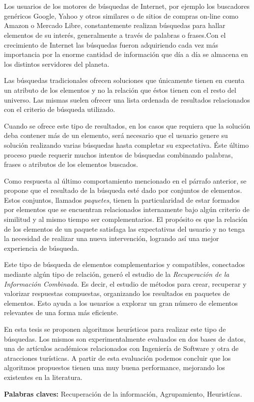 \chapter*{\runtitulo}

\noindent 

Los usuarios de los motores de búsquedas de Internet, por ejemplo los buscadores genéricos Google, Yahoo y otros similares o de sitios de compras on-line como Amazon o Mercado Libre, constantemente realizan búsquedas para hallar elementos de su interés, generalmente a través de palabras o frases.Con el crecimiento de Internet las búsquedas fueron adquiriendo cada vez más importancia por la enorme cantidad de información que día a día se almacena en los distintos servidores del planeta.

Las búsquedas tradicionales ofrecen soluciones que únicamente tienen en cuenta un atributo de los elementos y no la relación que éstos tienen con el resto del universo. Las mismas suelen ofrecer una lista ordenada de resultados relacionados con el criterio de búsqueda utilizado. 

Cuando se ofrece este tipo de resultados, en los casos que requiera que la solución deba contener más de un elemento, será necesario que el usuario genere su solución realizando varias búsquedas hasta completar su expectativa. Éste último proceso puede requerir muchos intentos de búsquedas combinando palabras, frases o atributos de los elementos buscados.

Como respuesta al último comportamiento mencionado en el párrafo anterior, se propone que el resultado de la búsqueda esté dado por conjuntos de elementos. Estos conjuntos, llamados {\em paquetes}, tienen la particularidad de estar formados por elementos que se encuentran relacionados internamente bajo algún criterio de similitud y al mismo tiempo ser complementarios. El propósito es que la relación de los elementos de un paquete satisfaga las expectativas del usuario y no tenga la necesidad de realizar una nueva intervención, logrando así una mejor experiencia de búsqueda.

Este tipo de búsqueda de elementos complementarios y compatibles, conectados mediante algún tipo de relación, generó el estudio de la {\em Recuperación de la Información Combinada}. Es decir, el estudio de métodos para crear, recuperar y valorizar respuestas compuestas, organizando los resultados en paquetes de elementos. Esto ayuda a los usuarios a explorar un gran número de elementos relevantes de una forma más eficiente.

En esta tesis se proponen algoritmos heurísticos para realizar este tipo de búsquedas. Los mismos son experimentalmente evaluados en dos bases de datos, una de artículos académicos relacionados con Ingeniería de Software y otra de atracciones turísticas. A partir de esta evaluación podemos concluir que los algoritmos propuestos tienen una muy buena performance, mejorando los existentes en la literatura.
\bigskip


\noindent\textbf{Palabras claves:} Recuperación de la información, Agrupamiento, Heuristícas.